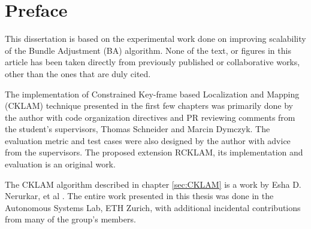 \chapter*{Preface}

This dissertation is based on the experimental work done on improving scalability of the Bundle Adjustment (BA) algorithm. None of the text, or figures in this article has been taken directly from previously published or collaborative works, other than the ones that are duly cited.

The implementation of Constrained Key-frame based Localization and Mapping (CKLAM) technique presented in the first few chapters was primarily done by the author with code organization directives and PR reviewing comments from the student's supervisors, Thomas Schneider and Marcin Dymczyk. The evaluation metric and test cases were also designed by the author with advice from the supervisors. The proposed extension RCKLAM, its implementation and evaluation is an original work.

The CKLAM algorithm described in chapter \ref{sec:CKLAM} is a work by Esha D. Nerurkar, et al \cite{CKLAM}. The entire work presented in this thesis was done in the Autonomous Systems Lab, ETH Zurich, with additional incidental contributions from many of the group’s members.
